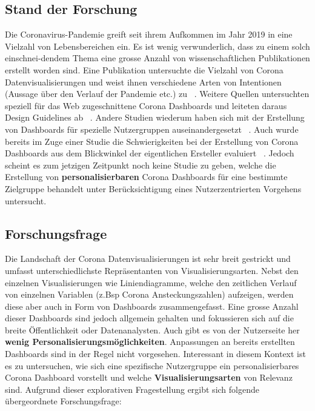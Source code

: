 \documentclass[12pt, oneside]{article}
\begin{document}
\subsection{Stand der Forschung}
Die Coronavirus-Pandemie greift seit ihrem Aufkommen im Jahr 2019 in eine Vielzahl von Lebensbereichen ein. Es ist wenig verwunderlich, dass zu einem solch einschnei-dendem Thema eine grosse Anzahl von wissenschaftlichen Publikationen erstellt worden sind. Eine Publikation untersuchte die Vielzahl von Corona Datenvisualisierungen und weist ihnen verschiedene Arten von Intentionen (Aussage über den Verlauf der Pandemie etc.) zu ~\citep{YixuanZhang.}. Weitere Quellen untersuchten speziell für das Web zugeschnittene Corona Dashboards und leiteten daraus Design Guidelines ab ~\citep{Ivankovic.2021}. Andere Studien wiederum haben sich mit der Erstellung von Dashboards für spezielle Nutzergruppen auseinandergesetzt ~\citep{Ivanov.2018}. Auch wurde bereits im Zuge einer Studie die Schwierigkeiten bei der Erstellung von Corona Dashboards aus dem Blickwinkel der eigentlichen Ersteller evaluiert ~\citep{Barbazza.}. Jedoch scheint es zum jetzigen Zeitpunkt noch keine Studie zu geben, welche die Erstellung von \textbf{personalisierbaren} Corona Dashboards für eine bestimmte Zielgruppe behandelt unter Berücksichtigung eines Nutzerzentrierten Vorgehens untersucht.


\subsection{Forschungsfrage}
Die Landschaft der Corona Datenvisualisierungen ist sehr breit gestrickt und umfasst unterschiedlichste Repräsentanten von Visualisierungsarten. Nebst den einzelnen Visualisierungen wie Liniendiagramme, welche den zeitlichen Verlauf von einzelnen Variablen (z.Bsp Corona Ansteckungszahlen) aufzeigen, werden diese aber auch in Form von Dashboards zusammengefasst. Eine grosse Anzahl dieser Dashboards sind jedoch  allgemein gehalten und fokussieren sich auf die breite Öffentlichkeit oder Datenanalysten. Auch gibt es von der Nutzerseite her \textbf{wenig Personalisierungsmöglichkeiten}. Anpassungen an bereits erstellten Dashboards sind in der Regel nicht vorgesehen. Interessant in diesem Kontext ist es zu untersuchen, wie sich eine spezifische Nutzergruppe ein personalisierbares Corona Dashboard vorstellt und welche \textbf{Visualisierungsarten} von Relevanz sind. Aufgrund dieser explorativen Fragestellung ergibt sich folgende übergeordnete Forschungsfrage:
\end{document}

